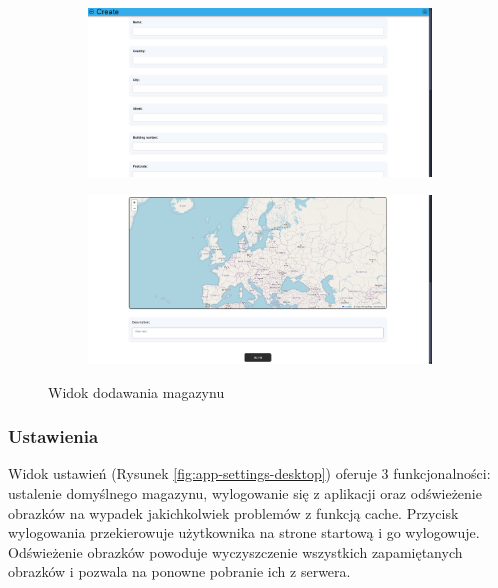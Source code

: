 \documentclass[../main.tex]{subfiles}
\begin{document}
            \begin{figure}[H]
                \begin{subfigure}{.49\textwidth}
                    \centering
                    \includegraphics[width=\getImageWidth]{images/app-desktop/app-warehouses-add1-desktop.png}
                    \label{fig:app-warehouses-add1-desktop}
                \end{subfigure}
                \begin{subfigure}{.49\textwidth}
                    \centering
                    \includegraphics[width=\getImageWidth]{images/app-desktop/app-warehouses-add2-desktop.png}
                    \label{fig:app-warehouses-add2-desktop}
                \end{subfigure}
                \caption{Widok dodawania magazynu}
                \label{fig:app-warehouses-add-desktop}
            \end{figure}

        \FloatBarrier 
        \subsubsection{Ustawienia}
            Widok ustawień (Rysunek \ref{fig:app-settings-desktop}) oferuje 3 funkcjonalności: ustalenie domyślnego magazynu, wylogowanie się z aplikacji oraz odświeżenie obrazków na wypadek jakichkolwiek problemów z funkcją cache.
            Przycisk wylogowania przekierowuje użytkownika na strone startową i go wylogowuje. Odświeżenie obrazków powoduje wyczyszczenie wszystkich zapamiętanych obrazków i pozwala na ponowne pobranie ich z serwera.
            
\end{document}
